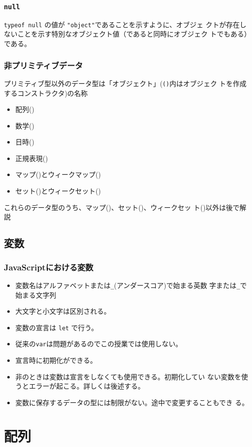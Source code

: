 \begin{frame}[containsverbatim]
 \frametitle{\texttt{null}}
\Verb+typeof null+ の値が \Verb+"object"+であることを示すように、オブジェ
クトが存在しないことを示す特別なオブジェクト値（であると同時にオブジェク
トでもある）である。
\end{frame}
\begin{frame}[containsverbatim]
\frametitle{非プリミティブデータ}
プリミティブ型以外のデータ型は「オブジェクト」(\texttt{()}内はオブジェク
トを作成するコンストラクタ)の名称
\begin{itemize}
 \item 配列()
 \item 数学()
 \item 日時()
 \item 正規表現()
 \item マップ()とウィークマップ()
 \item セット()とウィークセット()
\end{itemize}
 これらのデータ型のうち、マップ()、セット()、ウィークセッ
 ト()以外は後で解説
\end{frame}
\subsection{変数}
\begin{frame}[containsverbatim]
 \frametitle{JavaScriptにおける変数}
\begin{itemize}
 \item 変数名はアルファベットまたは\Verb+_+(アンダースコア)で始まる英数
       字または\Verb+_+で始まる文字列
 \item 大文字と小文字は区別される。
 \item 変数の宣言は \texttt{let} で行う。
 \item 従来の\texttt{var}は問題があるのでこの授業では使用しない。
 \item 宣言時に初期化ができる。
 \item 非\Strict のときは変数は宣言をしなくても使用できる。初期化してい
       ない変数を使うとエラーが起こる。詳しくは後述する。
 \item 変数に保存するデータの型には制限がない。途中で変更することもでき
       る。
\end{itemize}
\end{frame}
\section{配列}
